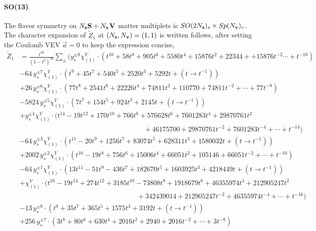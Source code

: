 \documentclass[letterpaper, 11pt]{article}
\newcommand{\nn}{\nonumber}
\begin{document}
{\paragraph{SO(13)} The flavor symmetry  on $N_{\bf s} \mathbf{S}+ N_{\bf v} \mathbf{V}$ matter multiplets is $SO(2N_{\bf s})_s \times  Sp(N_{\bf v})_v$. The character expansion of  $\tilde{Z}_1$ at $(N_{\bf s}, N_{\bf v}) = (1,1)$ is written follows, after setting the Coulomb VEV $\vec{a} = 0$ to keep the expression concise,
\begin{align}
  \label{eq:so13-s1v1}
  \tilde{Z}_1&=\frac{t^{20}}{(1-t^2)^{20}}\sum_{\pm}\Big(y_s^{\pm8}\chi^V_{(1)}\cdot (t^{10}+58 t^8+905 t^6+5580 t^4+15876 t^2+22344++15876 t^{-2} \cdots + t^{-10})\nn\\
  &-64\,y_s^{\pm7}\chi^V_{(1)} \cdot (t^9+45 t^7+540 t^5+2520 t^3+5292 t + (t\rightarrow t^{-1}))\nn\\
  &+26\,y_s^{\pm6}\chi^V_{(1)}\cdot (77 t^8+2541 t^6+22226 t^4+74811 t^2+110770 + 74811 t^{-2} + \cdots + 77 t^{-8})\nn\\
  &-5824\,y_s^{\pm5}\chi^V_{(1)} \cdot (7 t^7+154 t^5+924 t^3+2145 t + (t\rightarrow t^{-1}) )\nn\\
  &+y_s^{\pm4}\chi^V_{(1)} \cdot (t^{14}-19 t^{12}+170 t^{10}+766 t^8+576628 t^6 +7601283 t^4+29870761 t^2\nn\\
  &\qquad\qquad\qquad\qquad\qquad\qquad\qquad\qquad\qquad+46175700+ 29870761
  t^{-2} + 7601283 t^{-4}+\cdots +t^{-14})\nn\\
  &-64\,y_s^{\pm3}\chi^V_{(1)} \cdot (t^{11}-20 t^9+1256 t^7+83074 t^5+628311 t^3+1580032 t+ (t\rightarrow t^{-1}))\nn\\
  &+2002\,y_s^{\pm2}\chi^V_{(1)}\cdot (t^{10}-19 t^8+756 t^6+15006 t^4+66051 t^2+105146+66051 t^{-2} + \cdots + t^{-10})\nn\\
  &-64\,y_s^{\pm1}\chi^V_{(1)} \cdot (13 t^{11}-51 t^9-436 t^7+182670 t^5+1603925 t^3+4218449 t + (t\rightarrow t^{-1}))\nn\\
  &+\chi^V_{(1)} \cdot (t^{16}-19 t^{14}+274 t^{12}+3185 t^{10}-73808 t^8+1918679 t^6+46355974 t^4+212905247t^2\nn\\
  &\qquad\qquad\qquad\qquad\qquad\qquad\qquad\qquad\quad+342439014+212905247t^{-2}+46355974 t^{-4}+\cdots +t^{-16})\nn\\
  &-13\,y_s^{\pm8} \cdot (t^9+35 t^7+365 t^5+1575 t^3+3192 t+ (t\rightarrow t^{-1}))\nn\\
  &+256\,y_s^{\pm7}\cdot (3 t^8+80 t^6+630 t^4+2016
  t^2+2940+2016t^{-2}+\cdots+{3}t^{-8})\nn\\

\end{align}}
\end{document}
